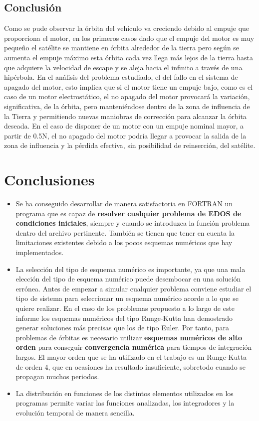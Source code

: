 \documentclass[11pt,singlespacing,liststotoc,headsepline,a4paper]{article}
\begin{document}
\subsection{Conclusión}
Como se pude observar la órbita del vehículo va creciendo debido al empuje que proporciona el motor, en los primeros casos dado que el empuje del motor es muy pequeño el satélite se mantiene en órbita alrededor de la tierra pero según se aumenta el empuje máximo esta órbita cada vez llega más lejos de la tierra hasta que adquiere la velocidad de escape y se aleja hacia el infinito a través de una hipérbola.
En el análisis del problema estudiado, el del fallo en el sistema de apagado del motor, esto implica que si el motor tiene un empuje bajo, como es el caso de un motor electrostático, el no apagado del motor provocará la variación, significativa, de la órbita, pero manteniéndose dentro de la zona de influencia de la Tierra y permitiendo nuevas maniobras de corrección para alcanzar la órbita deseada. 
En el caso de disponer de un motor con un empuje nominal mayor, a partir de 0.5N, el no apagado del motor podría llegar a provocar la salida de la zona de influencia y la pérdida efectiva, sin posibilidad de reinserción, del satélite. 

	\newpage
	
\section{Conclusiones}
\begin{itemize}
	\item Se ha conseguido desarrollar de manera satisfactoria en FORTRAN un programa que es capaz de \textbf{resolver cualquier problema de EDOS de condiciones iniciales}, siempre y cuando se introduzca la función problema dentro del archivo pertinente. También se tienen que tener en cuenta la limitaciones existentes debido a los pocos esquemas numéricos que hay implementados.
	\item La selección del tipo de esquema numérico es  importante, ya que una mala elección del tipo de esquema numérico puede desembocar en una solución errónea. Antes de empezar a simular cualquier problema conviene estudiar el tipo de sistema para seleccionar un esquema numérico acorde a lo que se quiere realizar. En el caso de los problemas propuesto a lo largo de este informe los esquemas numéricos del tipo Runge-Kutta han demostrado generar soluciones más precisas que los de tipo Euler. Por tanto, para problemas de órbitas es necesario utilizar \textbf{esquemas numéricos de alto orden} para conseguir \textbf{convergencia numérica} para tiempos de integración largos. El mayor orden que se ha utilizado en el trabajo es un Runge-Kutta de orden 4, que en ocasiones ha resultado insuficiente, sobretodo cuando se propagan muchos periodos. 
	\item La distribución en funciones de los distintos elementos utilizados en los programas permite variar las funciones analizadas, los integradores y la evolución temporal de manera sencilla.
\end{itemize}
\end{document}
